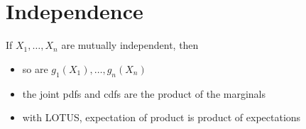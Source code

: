 \section{Independence}
If \(X_1, \dotsc, X_n\) are mutually independent, then
\begin{itemize}
  \item so are \(g_1(X_1), \dotsc, g_n(X_n)\)
  \item the joint pdfs and cdfs are the product of the marginals
  \item with LOTUS, expectation of product is product of expectations
\end{itemize}
